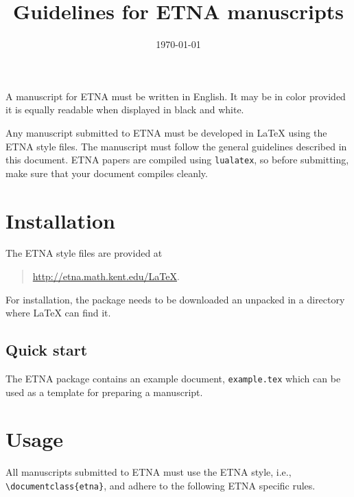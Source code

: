 \documentclass[parskip=half]{scrartcl}
\title{Guidelines for ETNA manuscripts}
\date{\today}
\begin{document}
\maketitle


A manuscript for ETNA must be written in English. It may be in color provided
it is equally readable when displayed in black and white.

Any manuscript submitted to ETNA must be developed in \LaTeX{} using the ETNA
style files. The manuscript must follow the general guidelines described in
this document.
ETNA papers are compiled using \texttt{lualatex}, so before submitting, make
sure that your document compiles cleanly.

\section{Installation}

The ETNA style files are provided at
\begin{quote}
\url{http://etna.math.kent.edu/LaTeX}.
\end{quote}
For installation, the package needs to be downloaded an unpacked in a directory
where \LaTeX{} can find it.

\subsection*{Quick start}
The ETNA package contains an example document, \texttt{example.tex} which can
be used as a template for preparing a manuscript.

\section{Usage}
All manuscripts submitted to ETNA must use the ETNA style, i.e.,
\verb|\documentclass{etna}|, and adhere to the following ETNA specific rules.
\end{document}
